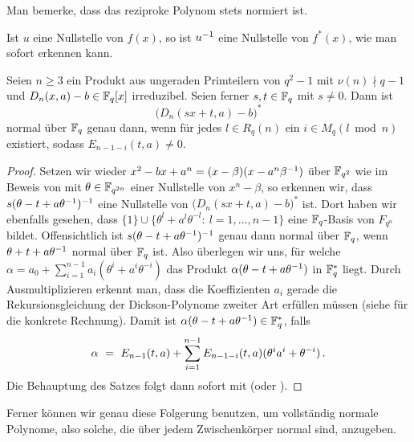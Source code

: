 \begin{bemerkung}
  Man bemerke, dass das reziproke Polynom stets normiert ist.
\end{bemerkung}

\begin{bemerkung}
  Ist $u$ eine Nullstelle von $f(x)$, so ist $u^{-1}$ eine Nullstelle von 
  $f^\ast(x)$, wie man sofort erkennen kann.
\end{bemerkung}

\begin{satz}%
  \label{satz:scheerhorn3}
  Seien $n\geq 3$ ein Produkt aus ungeraden Primteilern von 
  $q^2-1$ mit $\nu(n) \nmid q-1$ und
  $D_n(x,a)-b \in \mathbb{F}_q[x]$ irreduzibel. Seien ferner $s,t\in \mathbb{F}_q$ mit
  $s\neq 0$. Dann ist
  \[ \big(D_n(sx+t,a)-b\big)^\ast\]
  normal über $\mathbb{F}_q$ genau dann, wenn für jedes $l\in R_q(n)$ ein
  $i\in M_q(l\bmod n)$ existiert, sodass $E_{n-1-i}(t,a)\neq 0$.
\end{satz}
\begin{proof}
  Setzen wir wieder $x^2-bx+a^n = (x-\beta)(x-a^n\beta^{-1})$ über $\mathbb{F}_{q^2}$
  wie im Beweis von  mit $\theta \in \mathbb{F}_{q^{2n}}$ einer
  Nullstelle von $x^n-\beta$, so erkennen wir, dass
  $s(\theta-t+a\theta^{-1})^{-1}$ eine Nullstelle von 
  $\big(D_n(sx+t,a)-b\big)^\ast$ ist.
  Dort haben wir ebenfalls gesehen, dass
  $\{ 1\} \cup \{\theta^l+a^l\theta^{-l}:\ l=1,\ldots,n-1\}$ eine 
  $\mathbb{F}_q$-Basis von $F_{q^n}$ bildet. Offensichtlich ist
  $s(\theta-t+a\theta^{-1})^{-1}$ genau dann normal über $\mathbb{F}_q$, wenn
  $\theta+t+a\theta^{-1}$ normal über $\mathbb{F}_q$ ist. Also überlegen wir uns,
  für welche $\alpha = a_0 + \sum_{i=1}^{n-1} a_i(\theta^i+a^i\theta^{-i})$
  das Produkt $\alpha(\theta-t+a\theta^{-1})$ in $\mathbb{F}_q^\ast$ liegt.
  Durch Ausmultiplizieren erkennt man, dass die Koeffizienten $a_i$ gerade 
  die Rekursionsgleichung der Dickson-Polynome zweiter Art erfüllen müssen 
  (siehe \autocite[Beweis zu Theorem 4]{scheerhorn:1997} für die konkrete
  Rechnung). Damit ist $\alpha(\theta-t+a\theta^{-1}) \in \mathbb{F}_q^\ast$, falls
  \[ \alpha \ =\  E_{n-1}(t,a) + \sum_{i=1}^{n-1} E_{n-1-i}(t,a)
    (\theta^ia^i+\theta^{-i})\,.\]
  Die Behauptung des Satzes folgt dann sofort mit  
  (oder ).
\end{proof}


Ferner können wir genau diese Folgerung benutzen, um vollständig normale
Polynome, also solche, die über jedem Zwischenkörper normal sind, anzugeben.

